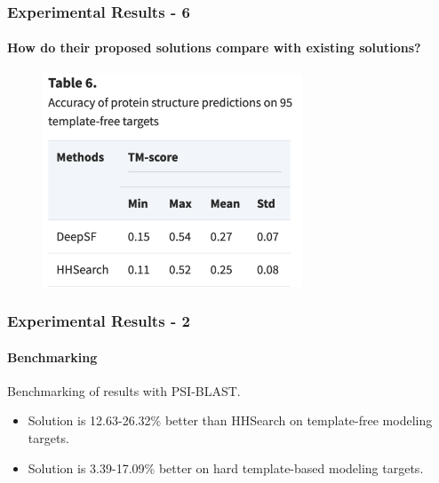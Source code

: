 \documentclass[xcolor={usenames,dvipsnames},hyperref={hyperindex,bookmarks}]{beamer}
\begin{document}
\frame
{
	\frametitle{Experimental Results - 6}
	\framesubtitle{How do their proposed solutions compare with existing solutions?}


	\begin{figure}[h]
	\centering 
	\includegraphics[height=2.5in]{./pics/table-6}
	\label{fig:Table6}
	\end{figure}
}
























%	
%	
%	








\frame
{
	\frametitle{Experimental Results - 2}
	\framesubtitle{Benchmarking}

	Benchmarking of results with PSI-BLAST.
	\begin{itemize}
	\item Solution is 12.63-26.32\% better than HHSearch on template-free modeling targets.
	\item Solution is 3.39-17.09\% better on hard template-based modeling targets.
	\end{itemize}

}
\end{document}
